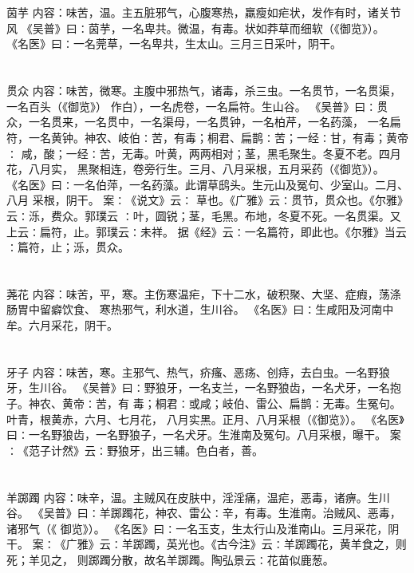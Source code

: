 \documentclass[12pt,UTF8]{ctexbook}
\begin{document}
\section{}茵芋
内容：味苦，温。主五脏邪气，心腹寒热，羸瘦如疟状，发作有时，诸关节风 
《吴普》曰∶茵芋，一名卑共。微温，有毒。状如莽草而细软（《御览》）。 
《名医》曰∶一名莞草，一名卑共，生太山。三月三日采叶，阴干。 


\section{}贯众
内容：味苦，微寒。主腹中邪热气，诸毒，杀三虫。一名贯节，一名贯渠，一名百头（《御览》） 
作白），一名虎卷，一名扁符。生山谷。 
《吴普》曰∶贯众，一名贯来，一名贯中，一名渠母，一名贯钟，一名柏芹，一名药藻， 
一名扁符，一名黄钟。神农、岐伯∶苦，有毒；桐君、扁鹊∶苦；一经∶甘，有毒；黄帝∶ 
咸，酸；一经∶苦，无毒。叶黄，两两相对；茎，黑毛聚生。冬夏不老。四月花，八月实， 
黑聚相连，卷旁行生。三月、八月采根，五月采药（《御览》）。 
《名医》曰∶一名伯萍，一名药藻。此谓草鸱头。生元山及冤句、少室山。二月、八月 
采根，阴干。 
案∶《说文》云∶ 草也。《广雅》云∶贯节，贯众也。《尔雅》云∶泺，费众。郭璞云 
∶叶，圆锐；茎，毛黑。布地，冬夏不死。一名贯渠。又上云∶扁符，止。郭璞云∶未祥。 
据《经》云∶一名篇符，即此也。《尔雅》当云∶篇符，止；泺，贯众。 


\section{}荛花
内容：味苦，平，寒。主伤寒温疟，下十二水，破积聚、大坚、症瘕，荡涤肠胃中留癖饮食、 
寒热邪气，利水道，生川谷。 
《名医》曰∶生咸阳及河南中牟。六月采花，阴干。 


\section{}牙子
内容：味苦，寒。主邪气、热气，疥瘙、恶疡、创痔，去白虫。一名野狼牙，生川谷。 
《吴普》曰∶野狼牙，一名支兰，一名野狼齿，一名犬牙，一名抱子。神农、黄帝∶苦，有 
毒；桐君∶或咸；岐伯、雷公、扁鹊∶无毒。生冤句。叶青，根黄赤，六月、七月花， 
八月实黑。正月、八月采根（《御览》）。 
《名医》曰∶一名野狼齿，一名野狼子，一名犬牙。生淮南及冤句。八月采根，曝干。 
案∶《范子计然》云∶野狼牙，出三辅。色白者，善。 


\section{}羊踯躅
内容：味辛，温。主贼风在皮肤中，淫淫痛，温疟，恶毒，诸痹。生川谷。 
《吴普》曰∶羊踯躅花，神农、雷公∶辛，有毒。生淮南。治贼风、恶毒，诸邪气（《 
御览》）。 
《名医》曰∶一名玉支，生太行山及淮南山。三月采花，阴干。 
案∶《广雅》云∶羊踯躅，英光也。《古今注》云∶羊踯躅花，黄羊食之，则死；羊见之， 
则踯躅分散，故名羊踯躅。陶弘景云∶花苗似鹿葱。 
\end{document}
